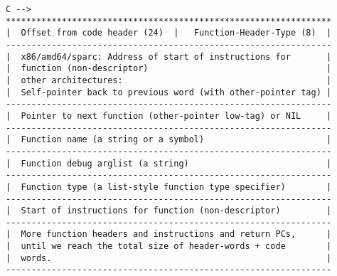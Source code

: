 \begin{verbatim}
C -->
****************************************************************
|  Offset from code header (24)  |   Function-Header-Type (8)  |
----------------------------------------------------------------
|  x86/amd64/sparc: Address of start of instructions for       |
|  function (non-descriptor)                                   |
|  other architectures:                                        |
|  Self-pointer back to previous word (with other-pointer tag) |
----------------------------------------------------------------
|  Pointer to next function (other-pointer low-tag) or NIL     |
----------------------------------------------------------------
|  Function name (a string or a symbol)                        |
----------------------------------------------------------------
|  Function debug arglist (a string)                           |
----------------------------------------------------------------
|  Function type (a list-style function type specifier)        |
----------------------------------------------------------------
|  Start of instructions for function (non-descriptor)         |
----------------------------------------------------------------
|  More function headers and instructions and return PCs,      |
|  until we reach the total size of header-words + code        |
|  words.                                                      |
----------------------------------------------------------------
\end{verbatim}

